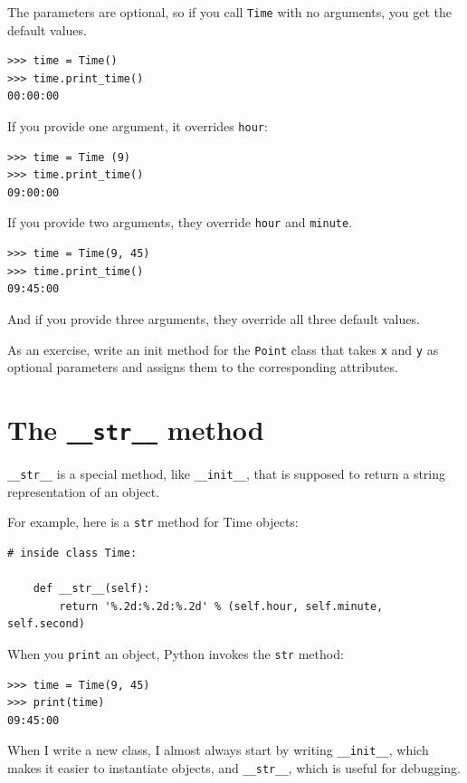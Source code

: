 \documentclass[10pt]{book}
\begin{document}
The parameters are optional, so if you call {\tt Time} with
no arguments, you get the default values.

\begin{verbatim}
>>> time = Time()
>>> time.print_time()
00:00:00
\end{verbatim}
%
If you provide one argument, it overrides {\tt hour}:

\begin{verbatim}
>>> time = Time (9)
>>> time.print_time()
09:00:00
\end{verbatim}
%
If you provide two arguments, they override {\tt hour} and
{\tt minute}.

\begin{verbatim}
>>> time = Time(9, 45)
>>> time.print_time()
09:45:00
\end{verbatim}
%
And if you provide three arguments, they override all three
default values.

As an exercise, write an init method for the {\tt Point} class that takes
{\tt x} and {\tt y} as optional parameters and assigns
them to the corresponding attributes.


\section{The {\tt \_\_str\_\_} method}

\verb"__str__" is a special method, like \verb"__init__",
that is supposed to return a string representation of an object.

For example, here is a {\tt str} method for Time objects:

\begin{verbatim}
# inside class Time:

    def __str__(self):
        return '%.2d:%.2d:%.2d' % (self.hour, self.minute, self.second)
\end{verbatim}
%
When you {\tt print} an object, Python invokes the {\tt str} method:

\begin{verbatim}
>>> time = Time(9, 45)
>>> print(time)
09:45:00
\end{verbatim}
%
When I write a new class, I almost always start by writing
\verb"__init__", which makes it easier to instantiate objects, and
\verb"__str__", which is useful for debugging.
\end{document}
